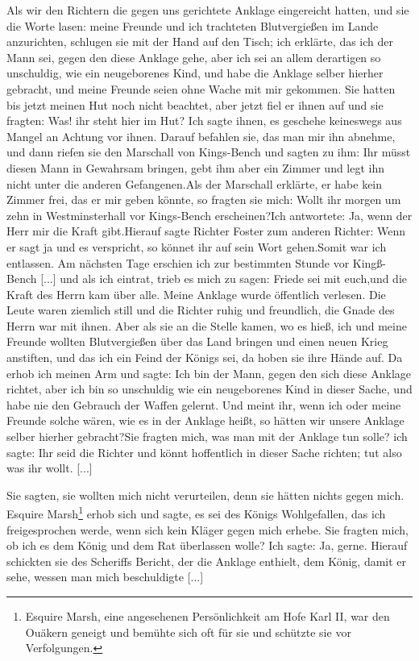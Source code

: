 Als wir den Richtern die gegen uns gerichtete Anklage eingereicht 
hatten, und sie die Worte lasen: meine Freunde und ich
trachteten Blutvergießen im Lande anzurichten, schlugen sie mit
der Hand auf den Tisch; ich erklärte, das ich der Mann sei,
gegen den diese Anklage gehe, aber ich sei an allem derartigen
so unschuldig, wie ein neugeborenes Kind, und habe die Anklage
selber hierher gebracht, und meine Freunde seien ohne Wache mit
mir gekommen. Sie hatten bis jetzt meinen Hut noch nicht
beachtet, aber jetzt fiel er ihnen auf und sie fragten: \glqq Was! ihr
steht hier im Hut? \grqq Ich sagte ihnen, es geschehe keineswegs
aus Mangel an Achtung vor ihnen. Darauf befahlen sie, das
man mir ihn abnehme, und dann riefen sie den Marschall von
Kings-Bench und sagten zu ihm: \glqq Ihr müsst diesen Mann in
Gewahrsam bringen, gebt ihm aber ein Zimmer und legt ihn nicht
unter die anderen Gefangenen.\grqq Als der Marschall erklärte, er
habe kein Zimmer frei, das er mir geben könnte, so fragten sie
mich: \glqq Wollt ihr morgen um zehn in Westminsterhall vor 
Kings-Bench erscheinen?\grqq Ich antwortete: \glqq Ja, wenn der Herr mir die
Kraft gibt.\grqq Hierauf sagte Richter Foster zum anderen Richter:
\glqq Wenn er sagt ja und es verspricht, so könnet ihr auf sein Wort
gehen.\grqq Somit war ich entlassen. Am nächsten Tage erschien
ich zur bestimmten Stunde vor Kingß-Bench [...] und als ich
eintrat, trieb es mich zu sagen: \glqq Friede sei mit euch,\grqq und die
Kraft des Herrn kam über alle. Meine Anklage wurde öffentlich
verlesen. Die Leute waren ziemlich still und die Richter ruhig
und freundlich, die Gnade des Herrn war mit ihnen. Aber als
sie an die Stelle kamen, wo es hieß, ich und meine Freunde
wollten Blutvergießen über das Land bringen und einen neuen
Krieg anstiften, und das ich ein Feind der Königs sei, da hoben
sie ihre Hände auf. Da erhob ich meinen Arm und sagte: \glqq Ich
bin der Mann, gegen den sich diese Anklage richtet, aber ich bin
so unschuldig wie ein neugeborenes Kind in dieser Sache, und
habe nie den Gebrauch der Waffen gelernt. Und meint ihr, wenn
ich oder meine Freunde solche wären, wie es in der Anklage
heißt, so hätten wir unsere Anklage selber hierher gebracht?\grqq [...]
Sie fragten mich, was man mit der Anklage tun solle? ich sagte:
\glqq Ihr seid die Richter und könnt hoffentlich in dieser Sache
richten; tut also was ihr wollt. [...]\grqq

Sie sagten, sie wollten mich nicht verurteilen, denn sie hätten
nichts gegen mich. Esquire Marsh\footnote{Esquire Marsh, eine 
angesehenen Persönlichkeit am Hofe Karl II, war den
Ouäkern geneigt und bemühte sich oft für sie und schützte sie vor 
Verfolgungen.} erhob sich und sagte, es sei
des Königs Wohlgefallen, das ich freigesprochen werde, wenn sich
kein Kläger gegen mich erhebe. Sie fragten mich, ob ich es dem
König und dem Rat überlassen wolle? Ich sagte: \glqq Ja, gerne.\grqq
Hierauf schickten sie des Scheriffs Bericht, der die Anklage enthielt,
dem König, damit er sehe, wessen man mich beschuldigte [...]

